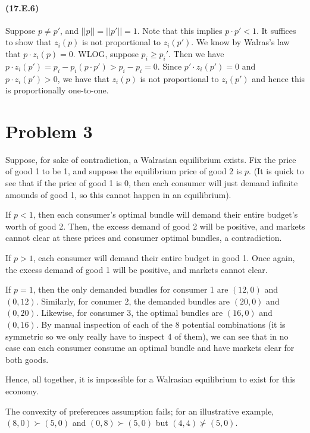 \documentclass[10pt,letter]{article}
\begin{document}
\paragraph{(17.E.6)}

Suppose $p \neq p'$, and $||p|| = ||p'|| = 1$. Note that this implies $p \cdot p' < 1$. It suffices to show that $z_i(p)$ is not proportional to $z_i(p')$. We know by Walras's law that $p \cdot z_i(p) = 0$. WLOG, suppose $p_i \ge p_i'$. Then we have $p \cdot z_i(p') = p_i - p_i (p \cdot p') > p_i - p_i = 0$. Since $p' \cdot z_i(p') = 0$ and $p \cdot z_i(p') > 0$, we have that $z_i(p)$ is not proportional to $z_i(p')$ and hence this is proportionally one-to-one.

\section*{Problem 3}
Suppose, for sake of contradiction, a Walrasian equilibrium exists. Fix the price of good 1 to be 1, and suppose the equilibrium price of good 2 is $p$. (It is quick to see that if the price of good 1 is 0, then each consumer will just demand infinite amounds of good 1, so this cannot happen in an equilibrium).

If $p < 1$, then each consumer's optimal bundle will demand their entire budget's worth of good 2. Then, the excess demand of good 2 will be positive, and markets cannot clear at these prices and consumer optimal bundles, a contradiction.

If $p > 1$, each consumer will demand their entire budget in good 1. Once again, the excess demand of good 1 will be positive, and markets cannot clear.

If $p = 1$, then the only demanded bundles for consumer 1 are $(12,0)$ and $(0, 12)$. Similarly, for conumer 2, the demanded bundles are $(20, 0)$ and $(0, 20)$. Likewise, for consumer 3, the optimal bundles are $(16,0)$ and $(0,16)$. By manual inspection of each of the 8 potential combinations (it is symmetric so we only really have to inspect 4 of them), we can see that in no case can each consumer consume an optimal bundle and have markets clear for both goods.

Hence, all together, it is impossible for a Walrasian equilibrium to exist for this economy.

The convexity of preferences assumption fails; for an illustrative example, $(8,0) \succ (5,0)$ and $(0,8) \succ (5,0)$ but $(4,4) \not \succ (5,0)$.
\end{document}
